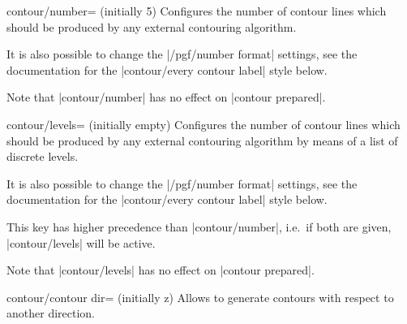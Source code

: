 {{\begin{pgfplotskey}{contour/number= (initially 5)}
	Configures the number of contour lines which should be produced by any external contouring algorithm.	
\pgfplotsexpensiveexample
\begin{codeexample}[]
\end{codeexample}
	It is also possible to change the |/pgf/number format| settings, see the documentation for the |contour/every contour label| style below.


	Note that |contour/number| has no effect on |contour prepared|.
\end{pgfplotskey}

\begin{pgfplotskey}{contour/levels= (initially empty)}
	Configures the number of contour lines which should be produced by any external contouring algorithm by means of a list of discrete levels.
\pgfplotsexpensiveexample
\begin{codeexample}[]
\end{codeexample}
	It is also possible to change the |/pgf/number format| settings, see the documentation for the |contour/every contour label| style below.

	This key has higher precedence than |contour/number|, i.e.\ if both are given, |contour/levels| will be active.

	Note that |contour/levels| has no effect on |contour prepared|.
\end{pgfplotskey}

\begin{pgfplotskey}{contour/contour dir= (initially z)}
%
	Allows to generate contours with respect to another direction.
\pgfplotsexpensiveexample
\begin{codeexample}[]
\end{codeexample}
	

\end{pgfplotskey}}}
